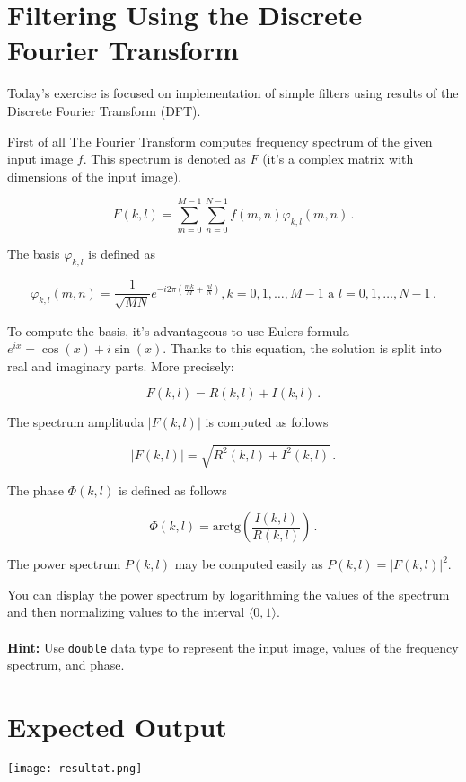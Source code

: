 \documentclass[12pt]{article}
\begin{document}
\section*{Filtering Using the Discrete Fourier Transform}

Today's exercise is focused on implementation of simple filters using results of the Discrete Fourier Transform (DFT).

First of all
\noindent
The Fourier Transform computes frequency spectrum of the given input image $f$.
This spectrum is denoted as $F$ (it's a complex matrix with dimensions of the input image).

\begin{equation}
    F(k, l) = \sum\limits_{m=0}^{M-1} \sum\limits_{n=0}^{N-1} f(m, n) \varphi_{k, l}(m, n)\,.
\end{equation}

\noindent
The basis $\varphi_{k, l}$ is defined as

\begin{equation}
    \varphi_{k, l}(m, n) = \frac{1}{\sqrt{MN}} e^{-i 2 \pi \left( \frac{mk}{M} + \frac{nl}{N} \right) }, k = 0, 1, \dots, M-1 \,\, \mathrm{a} \,\, l = 0, 1, \dots, N-1\,.
\end{equation}

\noindent
To compute the basis, it's advantageous to use Eulers formula $e^{ix} = \cos( x ) + i \sin( x )$.
Thanks to this equation, the solution is split into real and imaginary parts. More precisely:

\begin{equation}
    F(k, l) = R(k, l) + I(k, l)\, .
\end{equation}

\noindent
The spectrum amplituda $|F(k, l)|$ is computed as follows

\begin{equation}
    |F(k, l)| = \sqrt{ R^2(k, l) + I^2(k, l)}\, .
\end{equation}

\noindent
The phase $\Phi(k, l)$ is defined as follows

\begin{equation}
    \Phi(k, l) = \mathrm{arctg}\left( \frac{I(k, l)}{R(k, l)} \right)\, .
\end{equation}

\noindent
The power spectrum $P(k, l)$ may be computed easily as $ P(k, l) = |F(k, l)|^2$.

\noindent
You can display the power spectrum by logarithming the values of the spectrum and then normalizing values to the interval $\langle 0, 1\rangle$.
%
%
\\
\\
\noindent
\textbf{Hint:} Use \texttt{double} data type to represent the input image, values of the frequency spectrum, and phase.

\section*{Expected Output}

\begin{center}
\texttt{[image: resultat.png]}
\end{center}
\end{document}
